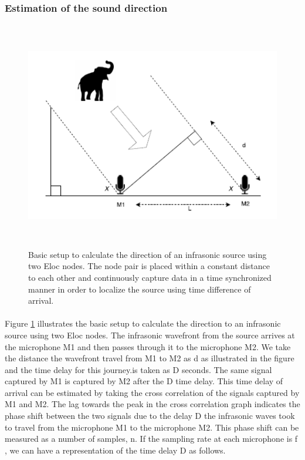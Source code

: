 \documentclass[12pt]{article}
\numberwithin{figure}{section}
\numberwithin{table}{section}
\begin{document}
\subsubsection{Estimation of the sound direction}

\begin{figure}[H]
\centering
\includegraphics[width=140mm,height=100mm]{direction.png}
\caption{Basic setup to calculate the direction of an infrasonic
source using two Eloc nodes. The node pair is placed
within a constant distance to each other and continuously
capture data in a time synchronized manner in order to localize
the source using time difference of arrival.}
\label{direction}
\end{figure}

\paragraph{}
Figure \ref{direction} illustrates the basic setup to calculate the direction to an infrasonic source using two Eloc nodes. The infrasonic wavefront from the source arrives at the microphone M1 and then passes through it to the microphone M2. We take the distance the wavefront travel from M1 to M2 as d as illustrated in the figure and the time delay for this journey.is taken as D seconds. The same signal captured by M1 is captured by M2 after the D time delay. This time delay of arrival can be estimated by taking the cross correlation of the signals captured by M1 and M2. The lag towards the peak in the cross correlation graph indicates the phase shift between the two signals due to the delay D the infrasonic waves took to travel from the microphone M1 to the microphone M2. This phase shift can be measured as a number of samples, n. If the sampling rate at each microphone is f , we can have a representation of the time delay D as follows. 
\end{document}
